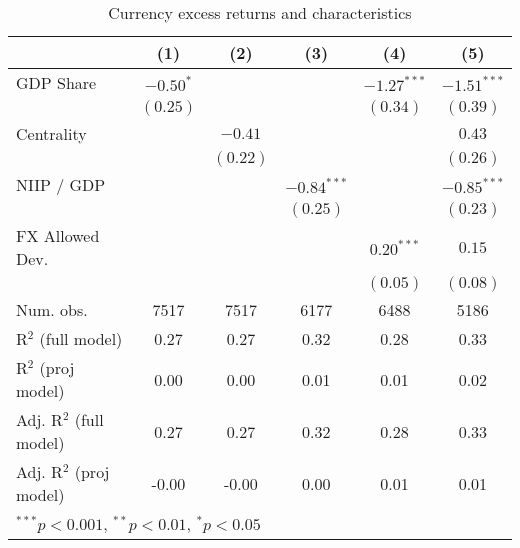 
\begin{table}
\begin{center}
\begin{tabular}{l c c c c c }
\hline
 & (1) & (2) & (3) & (4) & (5) \\
\hline
GDP Share               & $-0.50^{*}$ &          &               & $-1.27^{***}$ & $-1.51^{***}$ \\
                        & $(0.25)$    &          &               & $(0.34)$      & $(0.39)$      \\
Centrality              &             & $-0.41$  &               &               & $0.43$        \\
                        &             & $(0.22)$ &               &               & $(0.26)$      \\
NIIP / GDP              &             &          & $-0.84^{***}$ &               & $-0.85^{***}$ \\
                        &             &          & $(0.25)$      &               & $(0.23)$      \\
FX Allowed Dev.         &             &          &               & $0.20^{***}$  & $0.15$        \\
                        &             &          &               & $(0.05)$      & $(0.08)$      \\
\hline
Num. obs.               & 7517        & 7517     & 6177          & 6488          & 5186          \\
R$^2$ (full model)      & 0.27        & 0.27     & 0.32          & 0.28          & 0.33          \\
R$^2$ (proj model)      & 0.00        & 0.00     & 0.01          & 0.01          & 0.02          \\
Adj. R$^2$ (full model) & 0.27        & 0.27     & 0.32          & 0.28          & 0.33          \\
Adj. R$^2$ (proj model) & -0.00       & -0.00    & 0.00          & 0.01          & 0.01          \\
\hline
\multicolumn{6}{l}{\scriptsize{$^{***}p<0.001$, $^{**}p<0.01$, $^*p<0.05$}}
\end{tabular}
\caption{Currency excess returns and characteristics}
\label{table:rx_char}
\end{center}
\end{table}
